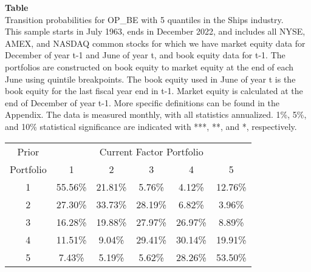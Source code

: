 \begin{table*}[ht!]
\raggedright
{}
\label{tab: transition_probs_OP_BE_Ships_with_5_quantiles}
\textbf{Table \thetable} \\
Transition probabilities for OP_BE with 5 quantiles in the Ships industry. \\
\hspace*{1em}This sample starts in July 1963, ends in December 2022, and includes all NYSE, AMEX, and NASDAQ common stocks for which we have market equity data for December of year t-1 and June of year t, and book equity data for t-1. The portfolios are constructed on book equity to market equity at the end of each June using quintile breakpoints.  The book equity used in June of year t is the book equity for the last fiscal year end in t-1.  Market equity is calculated at the end of December of year t-1.  More specific definitions can be found in the Appendix.  The data is measured monthly, with all statistics annualized.  1\%, 5\%, and 10\% statistical significance are indicated with ***, **, and *, respectively. \\
\vspace{0.5em}
\centering
\begin{adjustbox}{max width=\textwidth}
\begin{tabular}{@{}cccccc@{}}
\toprule
Prior & \multicolumn{5}{c}{Current Factor Portfolio} \\
Portfolio & 1 & 2 & 3 & 4 & 5 \\
\midrule
1 & 55.56\% & 21.81\% & 5.76\% & 4.12\% & 12.76\% \\
2 & 27.30\% & 33.73\% & 28.19\% & 6.82\% & 3.96\% \\
3 & 16.28\% & 19.88\% & 27.97\% & 26.97\% & 8.89\% \\
4 & 11.51\% & 9.04\% & 29.41\% & 30.14\% & 19.91\% \\
5 & 7.43\% & 5.19\% & 5.62\% & 28.26\% & 53.50\% \\
\bottomrule
\end{tabular}
\end{adjustbox}
\end{table*}